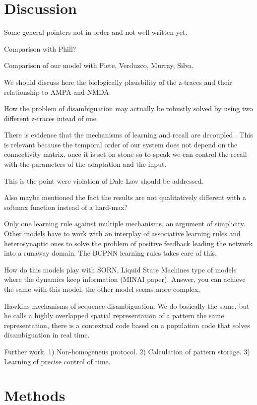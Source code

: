 \documentclass[10pt,a4paper]{article}
\begin{document}
\section{Discussion}

Some general pointers not in order and not well written yet.

Comparison with Phill?

Comparison of our model with Fiete, Verduzco, Murray, Silva. 

We should discuss here the biologically plausbility of the z-traces and their relationship to AMPA and NMDA 

How the problem of disambiguation may actually be robustly solved by using two different z-traces intead of one

There is evidence that the mechanisms of learning and recall  are decoupled \cite{kawai2015motor}. This is relevant because the temporal order of our system does not depend on the connectivity matrix, once it is set on stone so to speak we can control the recall with the parameters of the adaptation and the input. 

This is the point were violation of Dale Law should be addressed. 

Also maybe mentioned the fact the results are not qualitatively different with a softmax function instead of a hard-max?

Only one learning rule against multiple mechanisms, an argument of simplicity. Other models have to work with an interplay of associative learning rules and heterosynaptic ones to solve the problem of positive feedback leading the network into a runaway domain. The BCPNN learning rules takes care of this.

How do this models play with SORN, Liquid State Machines type of models where the dynamics keep information (MINAI paper). Answer, you can achieve the same with this model, the other model seems more complex.

Hawkins mechanisms of sequence disambiguation. We do basically the same, but he calls a highly overlapped spatial representation of a pattern the same representation, there is a contextual code based on a population code that solves disambiguation in real time. 

Further work. 1) Non-homogeneus protocol. 2) Calculation of pattern storage. 3) Learning of precise control of time.


\section{Methods}
\end{document}

